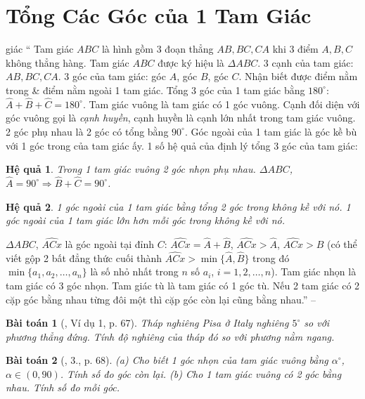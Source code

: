 \documentclass{article}
\newtheorem{baitoan}{Bài toán}
\newtheorem{hequa}{Hệ quả}
\begin{document}

\section{Tổng Các Góc của 1 Tam Giác}giác
`` Tam giác $ABC$ là hình gồm 3 đoạn thẳng $AB,BC,CA$ khi 3 điểm $A,B,C$ không thẳng hàng. Tam giác $ABC$ được ký hiệu là $\Delta ABC$. 3 cạnh của tam giác: $AB,BC,CA$. 3 góc của tam giác: góc $A$, góc $B$, góc $C$. Nhận biết được điểm nằm trong \& điểm nằm ngoài 1 tam giác.  Tổng 3 góc của 1 tam giác bằng $180^\circ$: $\widehat{A} + \widehat{B} + \widehat{C} = 180^\circ$.  Tam giác vuông là tam giác có 1 góc vuông. Cạnh đối diện với góc vuông gọi là \textit{cạnh huyền}, cạnh huyền là cạnh lớn nhất trong tam giác vuông. 2 góc phụ nhau là 2 góc có tổng bằng $90^\circ$. Góc ngoài của 1 tam giác là góc kề bù với 1 góc trong của tam giác ấy.  1 số hệ quả của định lý tổng 3 góc của tam giác:

\begin{hequa}
	Trong 1 tam giác vuông 2 góc nhọn phụ nhau. $\Delta ABC$, $\widehat{A} = 90^\circ\Rightarrow\widehat{B} + \widehat{C} = 90^\circ$.
\end{hequa}

\begin{hequa}
	1 góc ngoài của 1 tam giác bằng tổng 2 góc trong không kề với nó. 1 góc ngoài của 1 tam giác lớn hơn mỗi góc trong không kề với nó.
\end{hequa}
$\Delta ABC$, $\widehat{ACx}$ là góc ngoài tại đỉnh $C$: $\widehat{ACx} = \widehat{A} + \widehat{B}$, $\widehat{ACx} > \widehat{A}$, $\widehat{ACx} > \widehat{B}$ (có thể viết gộp 2 bất đẳng thức cuối thành $\widehat{ACx} > \min\{\widehat{A},\widehat{B}\}$ trong đó $\min\{a_1,a_2,\ldots,a_n\}$ là số nhỏ nhất trong $n$ số $a_i$, $i = 1,2,\ldots,n$).  Tam giác nhọn là tam giác có 3 góc nhọn. Tam giác tù là tam giác có 1 góc tù. Nếu 2 tam giác có 2 cặp góc bằng nhau từng đôi một thì cặp góc còn lại cũng bằng nhau.'' -- \cite[Chap. IV, \S1, p.65]{Tuyen_Toan_7}

\begin{baitoan}[\cite{SBT_Toan_7_Canh_Dieu_tap_2}, Ví dụ 1, p. 67]
	Tháp nghiêng Pisa ở Italy nghiêng $5^\circ$ so với phương thẳng đứng. Tính độ nghiêng của tháp đó so với phương nằm ngang.
\end{baitoan}

\begin{baitoan}[\cite{SBT_Toan_7_Canh_Dieu_tap_2}, 3., p. 68]
	(a) Cho biết 1 góc nhọn của tam giác vuông bằng $\alpha^\circ$, $\alpha\in(0,90)$. Tính số đo góc còn lại. (b) Cho 1 tam giác vuông có 2 góc bằng nhau. Tính số đo mỗi góc.
\end{baitoan}
\end{document}

